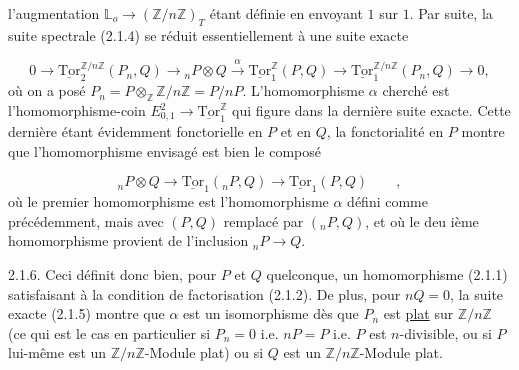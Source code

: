 
 l'augmentation $\mathbb{L}_o \longrightarrow (\mathbb{Z}/n\mathbb{Z})_T$ étant définie en envoyant $1$ sur $1$. Par suite, la suite spectrale (2.1.4) se réduit essentiellement à une suite exacte

\begin{equation}\tag{2.1.5}
0 \to \underline{\mathrm{Tor}}_2^{\mathbb{Z}/n\mathbb{Z}}(P_n,Q) \to {}_nP \otimes Q \stackrel{\alpha}{\longrightarrow} \underline{\mathrm{Tor}}_1^{\mathbb{Z}}(P,Q) \longrightarrow \underline{\mathrm{Tor}}_1^{\mathbb{Z}/n\mathbb{Z}}(P_n,Q) \to 0,
\end{equation}
où on a posé $P_n = P\otimes_{\mathbb{Z}} \mathbb{Z}/n\mathbb{Z} = P/nP$. L'homomorphisme $\alpha$ cherché est l'homomorphisme-coin $E^2_{0,1} \longrightarrow \underline{\mathrm{Tor}}_1^{\mathbb{Z}}$ qui figure dans la dernière suite exacte. Cette dernière étant évidemment fonctorielle en $P$ et en $Q$, la fonctorialité en $P$ montre que l'homomorphisme envisagé est bien le composé

\begin{equation*}
{}_nP \otimes Q \longrightarrow \underline{\mathrm{Tor}}_1({}_nP,Q) \longrightarrow \underline{\mathrm{Tor}}_1(P,Q) \qquad ,
\end{equation*}
où le premier homomorphisme est l'homomorphisme $\alpha$ défini comme précédemment, mais avec $(P,Q)$ remplacé par $({}_nP,Q)$, et où le deu ième homomorphisme provient de l'inclusion ${}_nP \longrightarrow Q$.

2.1.6. Ceci définit donc bien, pour $P$ et $Q$ quelconque, un homomorphisme (2.1.1) satisfaisant à la condition de factorisation (2.1.2). De plus, pour $nQ=0$, la suite exacte (2.1.5) montre que $\alpha$ est un isomorphisme dès que $P_n$ est \underline{plat} sur $\mathbb{Z}/n\mathbb{Z}$ (ce qui est le cas en particulier si $P_n = 0$ i.e. $nP=P$ i.e. $P$ est $n$-divisible, ou si $P$ lui-même est un $\mathbb{Z}/n\mathbb{Z}$-Module plat) ou si $Q$ est un $\mathbb{Z}/n\mathbb{Z}$-Module plat.

